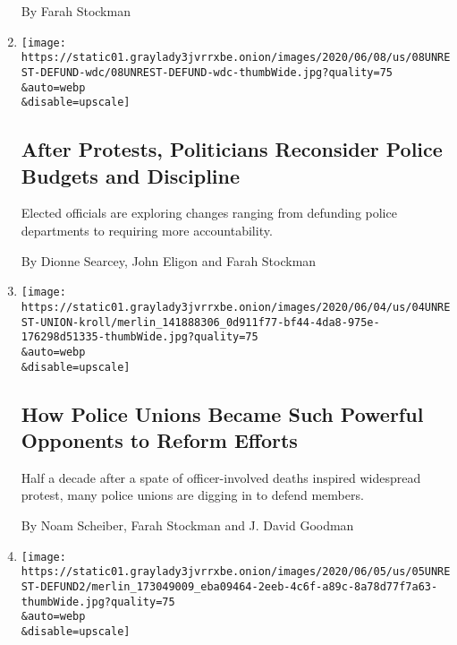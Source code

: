 \begin{enumerate}
  By Farah Stockman
\item
  \href{/2020/06/08/us/unrest-defund-police.html}{}

  \texttt{[image: https://static01.graylady3jvrrxbe.onion/images/2020/06/08/us/08UNREST-DEFUND-wdc/08UNREST-DEFUND-wdc-thumbWide.jpg?quality=75\\\&auto=webp\\\&disable=upscale]}

  \hypertarget{after-protests-politicians-reconsider-police-budgets-and-discipline}{%
  \subsection{After Protests, Politicians Reconsider Police Budgets and
  Discipline}\label{after-protests-politicians-reconsider-police-budgets-and-discipline}}

  Elected officials are exploring changes ranging from defunding police
  departments to requiring more accountability.

  By Dionne Searcey, John Eligon and Farah Stockman
\item
  \href{/2020/06/06/us/police-unions-minneapolis-kroll.html}{}

  \texttt{[image: https://static01.graylady3jvrrxbe.onion/images/2020/06/04/us/04UNREST-UNION-kroll/merlin\_141888306\_0d911f77-bf44-4da8-975e-176298d51335-thumbWide.jpg?quality=75\\\&auto=webp\\\&disable=upscale]}

  \hypertarget{how-police-unions-became-such-powerful-opponents-to-reform-efforts}{%
  \subsection{How Police Unions Became Such Powerful Opponents to Reform
  Efforts}\label{how-police-unions-became-such-powerful-opponents-to-reform-efforts}}

  Half a decade after a spate of officer-involved deaths inspired
  widespread protest, many police unions are digging in to defend
  members.

  By Noam Scheiber, Farah Stockman and J. David Goodman
\item
  \href{/2020/06/05/us/defund-police-floyd-protests.html}{}

  \texttt{[image: https://static01.graylady3jvrrxbe.onion/images/2020/06/05/us/05UNREST-DEFUND2/merlin\_173049009\_eba09464-2eeb-4c6f-a89c-8a78d77f7a63-thumbWide.jpg?quality=75\\\&auto=webp\\\&disable=upscale]}

  \hypertarget{cities-ask-if-its-time-to-defund-police-and-reimagine-public-safety}{%
}
\end{enumerate}
